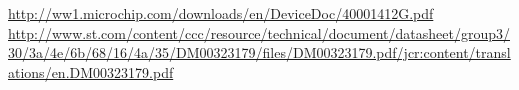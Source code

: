 \begin{thebibliography}{99}
\label{sec:ref}


	\url{http://ww1.microchip.com/downloads/en/DeviceDoc/40001412G.pdf}
	\url{http://www.st.com/content/ccc/resource/technical/document/datasheet/group3/30/3a/4e/6b/68/16/4a/35/DM00323179/files/DM00323179.pdf/jcr:content/translations/en.DM00323179.pdf}

\begin{comment}

\bibitem{cad}
	\url{https://www.autodesk.com/products/fusion-360/overview}
\bibitem{wind_meas}
	\url{ltu.diva-portal.org/smash/get/diva2:1039147/FULLTEXT01.pdf}
\bibitem{load_cell}
	\url{http://www.te.com/commerce/DocumentDelivery/DDEController?Action=srchrtrv&DocNm=FX19&DocType=DS&DocLang=English}
\bibitem{webpage}
	\url{http://www.lygte-info.dk/info/battery\%20protection\%20UK.html}



\end{comment}
\end{thebibliography}
